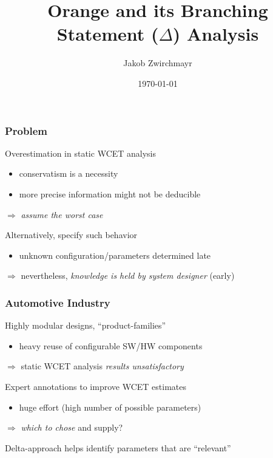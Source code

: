 \documentclass{beamer}
\author{Jakob Zwirchmayr}
\title{Orange and its Branching Statement ($\Delta$) Analysis}
\date{\today}
\begin{document}
\maketitle



\begin{frame}[fragile]
  \frametitle{Problem}

  \bigskip
  Overestimation in static WCET analysis 
  \begin{itemize}
    \item conservatism is a necessity
    \item more precise information might not be deducible 
  \end{itemize}

  \medskip
  $\Rightarrow$ {\it assume the worst case} \\

  \pause 

  \bigskip
  Alternatively, specify such behavior
  \begin{itemize}
    \item unknown configuration/parameters determined late  
  \end{itemize}

  \medskip
  $\Rightarrow$ nevertheless, {\it knowledge is held by system designer} (early)
\end{frame}



\begin{frame}[fragile]
  \frametitle{Automotive Industry}

  \bigskip
  Highly modular designs, ``product-families''
  \begin{itemize}
    \item heavy reuse of configurable SW/HW components
  \end{itemize}

  \medskip
  $\Rightarrow$ static WCET analysis {\it results unsatisfactory} \\

  \pause 

  \bigskip
  Expert annotations to improve WCET estimates
  \begin{itemize}
    \item huge effort (high number of possible parameters)
  \end{itemize}

  \medskip
  $\Rightarrow$ {\it which to chose} and supply? \\

  \pause 

  \bigskip
  Delta-approach helps identify parameters that are ``relevant''
\end{frame}
\end{document}
